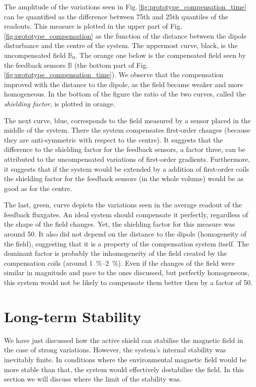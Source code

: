 The amplitude of the variations seen in Fig.\,\ref{fig:prototype_compensation_time} can be quantified as the difference between 75th and 25th quantiles of the readouts. This measure is plotted in the upper part of Fig.\,\ref{fig:prototype_compensation} as the function of the distance between the dipole disturbance and the centre of the system. The uppermost curve, black, is the uncompensated field $\mathbb{B}_0$. The orange one below is the compensated field seen by the feedback sensors $\mathbb{B}$ (the bottom part of Fig.\,\ref{fig:prototype_compensation_time}). We observe that the compensation improved with the distance to the dipole, as the field became weaker and more homogeneous. In the bottom of the figure the ratio of the two curves, called the \emph{shielding factor}, is plotted in orange.

The next curve, blue, corresponds to the field measured by a sensor placed in the middle of the system. There the system compensates first-order changes (because they are anti-symmetric with respect to the centre). It suggests that the difference to the shielding factor for the feedback sensors, a factor three, can be attributed to the uncompensated variations of first-order gradients. Furthermore, it suggests that if the system would be extended by a addition of first-order coils the shielding factor for the feedback sensors (in the whole volume) would be as good as for the centre.

The last, green, curve depicts the variations seen in the average readout of the feedback fluxgates. An ideal system should compensate it perfectly, regardless of the shape of the field changes. Yet, the shielding factor for this measure was around 50. It also did not depend on the distance to the dipole (homogeneity of the field), suggesting that it is a property of the compensation system itself. The dominant factor is probably the inhomogeneity of the field created by the compensation coils (around \SIrange[range-phrase=--,range-units=single]{1}{2}{\percent}). Even if the changes of the field were similar in magnitude and pace to the ones discussed, but perfectly homogeneous, this system would not be likely to compensate them better then by a factor of 50.




\section{Long-term Stability}
We have just discussed how the active shield can stabilise the magnetic field in the case of strong variations. However, the system's internal stability was inevitably finite. In conditions where the environmental magnetic field would be more stable than that, the system would effectively destabilise the field. In this section we will discuss where the limit of the stability was.

